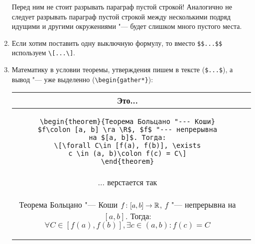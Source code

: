\begin{enumerate}
	Перед ним не стоит разрывать параграф пустой строкой!
	Аналогично не следует разрывать параграф пустой строкой между несколькими подряд идущими
	 и другими окружениями "--- будет слишком много пустого места.

\item 
	Если хотим поставить одну выключную формулу, то вместо \verb!$$...$$! используем \verb!\[...\]!.

\item 
	Математику в условии теоремы, утверждения пишем в тексте (\verb'$...$'), а вывод "--- уже выделенно (\verb'\begin{gather*}'):
	\begin{center}\begin{tabular}{|c|c|}
		\hline
		Это... \\\hline
		\begin{minipage}{11.5cm}
\begin{verbatim}
\begin{theorem}{Теорема Больцано "--- Коши}
$f\colon [a, b] \ra \R$, $f$ "--- непрерывна
на $[a, b]$. Тогда:
\[\forall C\in [f(a), f(b)], \exists
c \in (a, b)\colon f(c) = C\]
\end{theorem}
\end{verbatim}
		\end{minipage} 
		\\\hline
		... верстается так \\\hline
		\begin{minipage}{11.5cm}
			\begin{theorem}{Теорема Больцано "--- Коши}
			$f\colon [a, b] \rightarrow \mathbb{R}$, $f$ "--- непрерывна на $[a, b]$. Тогда:
			\[\forall C\in [f(a), f(b)], \exists c \in (a, b)\colon f(c) = C\]
			\end{theorem}
		\end{minipage}
		\\\hline
	\end{tabular}\end{center}


\end{enumerate}
